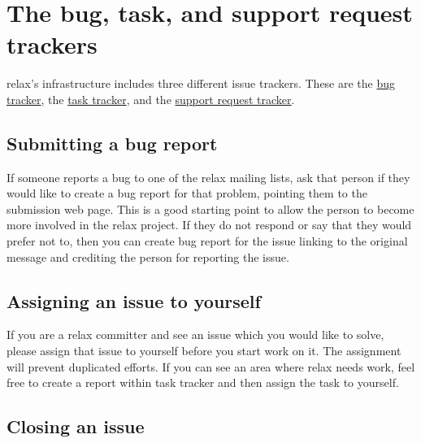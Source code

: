 
\section{The bug, task, and support request trackers}

relax's infrastructure includes three different issue trackers.
These are the \href{https://web.archive.org/web/https://gna.org/bugs/?group=relax}{bug tracker}, the \href{https://web.archive.org/web/https://gna.org/task/?group=relax}{task tracker}, and the \href{https://web.archive.org/web/https://gna.org/support/?group=relax}{support request tracker}.



\subsection{Submitting a bug report}

If someone reports a bug to one of the relax mailing lists, ask that person if they would like to create a bug report for that problem, pointing them to the submission web page.
This is a good starting point to allow the person to become more involved in the relax project.
If they do not respond or say that they would prefer not to, then you can create bug report for the issue linking to the original message and crediting the person for reporting the issue.



\subsection{Assigning an issue to yourself}

If you are a relax committer and see an issue which you would like to solve, please assign that issue to yourself before you start work on it.
The assignment will prevent duplicated efforts.
If you can see an area where relax needs work, feel free to create a report within task tracker and then assign the task to yourself.



\subsection{Closing an issue}

